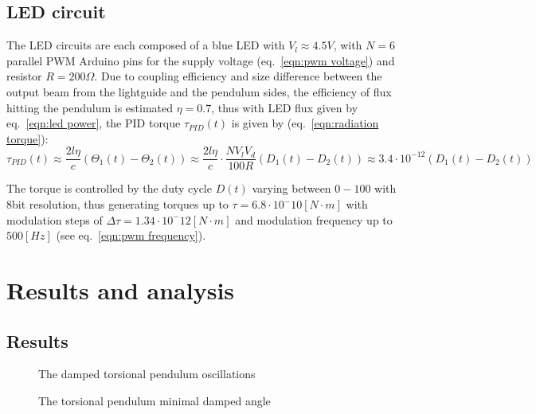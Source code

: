 \documentclass[\main/master.tex]{subfiles}
\begin{document}
\subsection{LED circuit}
The LED circuits are each composed of a blue LED with $V_l\approx 4.5V$, with $N=6$ parallel PWM Arduino pins for the supply voltage (eq.~\ref{eqn:pwm voltage}) and resistor $R = 200\Omega$. Due to coupling efficiency and size difference between the output beam from the lightguide and the pendulum sides, the efficiency of flux hitting the pendulum is estimated $\eta = 0.7$, thus with LED flux given by eq.~\ref{eqn:led power}, the PID torque $\tau_{PID}(t)$ is given by (eq.~\ref{eqn:radiation torque}):
\begin{equation}
\tau_{PID}(t) \approx \frac{2l\eta}{{c}} (\Theta_1(t) -\Theta_2(t)) \approx \frac{2l\eta}{{c}} \cdot\frac{N V_l V_d}{100R}(D_1(t) -D_2(t))  \approx   3.4\cdot 10^{-12}(D_1(t) -D_2(t)) 
\label{eqn:led torque}
\end{equation}
\par\noindent
The torque is controlled by the duty cycle $D(t)$ varying between $0-100$ with 8bit resolution, thus generating torques up to $\tau = 6.8\cdot10^-{10} [N\cdot m]$ with modulation steps of $\Delta\tau = 1.34\cdot10^-{12} [N\cdot m]$ and modulation frequency up to $500[Hz]$ (see eq.~\ref{eqn:pwm frequency}).
\section{Results and analysis} 
\subsection{Results}

\begin{figure}[htbp]
	\centering
	\caption[The damped torsional pendulum oscillations]{The damped torsional pendulum oscillations}
	\label{fig:measured oscillation angle}
\end{figure}
\begin{figure}[htbp]
	\centering
	\caption[The torsional pendulum minimal damped angle]{The torsional pendulum minimal damped angle}
	\label{fig:measured oscillation angle 1}
\end{figure}
\end{document}
